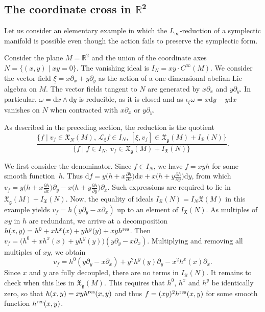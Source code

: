 \documentclass[pdftex]{sigma}
\numberwithin{equation}{section}
\newcommand{\R}{\mathbb{R}}
\newcommand{\g}{\mathfrak{g}}
\newcommand{\fgmodule}{\mathfrak{X}_{\g}}
\newcommand{\tgtvf}{\mathfrak X_N(M)}
\newcommand{\vanvf}{I_{\mathfrak{X}}(N)}%
\renewcommand{\L}{\mathscr{L}}
\renewcommand{\d}{\mathrm{d}}
\begin{document}
\subsection[The coordinate cross in R\^{}2]{The coordinate cross in $\boldsymbol{\R^2}$}\label{Ssec:coordinate_cross}

Let us consider an elementary example in which the $L_\infty$-reduction of a symplectic manifold is possible even though the action fails to preserve the symplectic form.

Consider the plane $M=\mathbb R^2$ and the union of the coordinate axes $N=\{ (x,y) \mid  xy=0\}$. The vanishing ideal is $I_N=xy\cdot C^\infty(M)$. We consider the vector field $\underline\xi =x\partial_x+y\partial_y$ as the action of a one-dimensional abelian Lie algebra on $M$. The vector fields tangent to $N$ are generated by $x\partial_x$ and $y\partial_y$. In particular, $\omega=\d x\wedge \d y$ is reducible, as it is closed and as $\iota_\xi\omega= x \d y-y\d x$ vanishes on $N$ when contracted with $x\partial_x$ or $y\partial_y$.

As described in the preceding section, the reduction is the quotient
\[
	\frac{ \bigl\{ f\mid  v_f\in \tgtvf,\, \L_\xi f\in I_N,\, [\underline{\xi},v_f]\in \fgmodule(M) + \vanvf \bigr\}
	}{
	\{
	f\mid  f\in I_N,\, v_f\in \fgmodule(M) + \vanvf
	\}
	}.
\]

We first consider the denominator. Since $f\in I_N$, we have $f=xyh$ for some smooth function~$h$. Thus $\d f=y\bigl(h+x\frac{\partial h}{\partial x}\bigr)\d x +x\bigl(h+y\frac{\partial h}{\partial y}\bigr)\d y$, from which $v_f=y\bigl(h+x\frac{\partial h}{\partial x}\bigr)\partial_y - x{\bigl(h+y\frac{\partial h}{\partial y}\bigr)}\partial_x$. Such expressions are required to lie in $\fgmodule(M)+\vanvf$. Now, the equality of ideals $\vanvf=I_N \mathfrak X(M)$ in this example yields $v_f=h(y\partial_y-x\partial_x)$ up to an element of $\vanvf$. As multiples of $xy$ in $h$ are redundant, we arrive at a decomposition $h(x,y)=h^0 + xh^x(x)+yh^y(y)+xyh^{\rm res}$. Then $v_f= \bigl(h^0+xh^x(x)+yh^y(y)\bigr)(y\partial_y-x\partial_x)$. Multiplying and removing all multiples of $xy$, we obtain
\[
v_f=h^0(y\partial_y-x\partial_x) + y^2h^y(y)\partial_y - x^2h^x(x)\partial_x .
\]
Since $x$ and $y$ are fully decoupled, there are no terms in $\vanvf$. It remains to check when this lies in $\fgmodule(M)$. This requires that $h^0$, $h^x$ and $h^y$ be identically zero, so that $h(x,y)=xyh^{\rm res}(x,y)$ and thus $f=(xy)^2h^{\rm res}(x,y)$ for some smooth function $h^{\rm res}(x,y)$.
\end{document}
